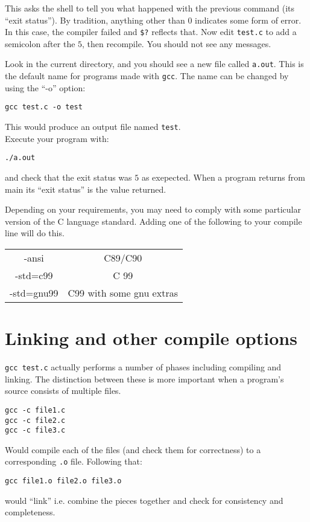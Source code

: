 This asks the shell to tell you what happened with the previous command (its ``exit status'').
By tradition, anything other than $0$ indicates some form of error.
In this case, the compiler failed and \verb!$?! reflects that.
Now edit \texttt{test.c} to add a semicolon after the $5$, then recompile.
You should not see any messages.

Look in the current directory, and you should see a new file called \texttt{a.out}.
This is the default name for programs made with \texttt{gcc}. The name can be changed
by using the ``-o'' option:

\begin{verbatim}
gcc test.c -o test
\end{verbatim}
This would produce an output file named \texttt{test}.
\\
Execute your program with:
\begin{verbatim}
./a.out 
\end{verbatim}
and check that the exit status was $5$ as exepected. When a program returns from main its ``exit status'' is the value returned.

Depending on your requirements, you may need to comply with some particular version of the C language standard.
Adding one of the following to your compile line will do this.

\begin{tabular}{c|c}
-ansi & C89/C90 \\
-std=c99 & C 99 \\
-std=gnu99 & C99 with some gnu extras\\
\end{tabular}


\section{Linking and other compile options}
\texttt{gcc test.c} actually performs a number of phases including compiling and linking.
The distinction between these is more important when a program's source consists of multiple 
files.
\begin{verbatim}
gcc -c file1.c
gcc -c file2.c
gcc -c file3.c
\end{verbatim}
Would compile each of the files (and check them for correctness) to a corresponding \texttt{.o} file.
Following that:
\begin{verbatim}
gcc file1.o file2.o file3.o 
\end{verbatim}
would ``link'' i.e. combine the pieces together and check for consistency and completeness.

